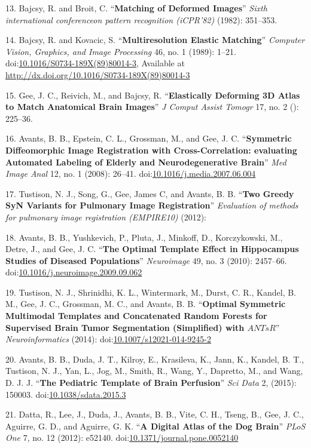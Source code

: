 \documentclass[11pt,]{article}
\begin{document}
13. Bajcsy, R. and Broit, C. ``\textbf{Matching of Deformed Images}''
\emph{Sixth international conferenceon pattern recognition (iCPR'82)}
(1982): 351--353.

14. Bajcsy, R. and Kovacic, S. ``\textbf{Multiresolution Elastic
Matching}'' \emph{Computer Vision, Graphics, and Image Processing} 46,
no. 1 (1989): 1--21.
doi:\href{http://dx.doi.org/10.1016/S0734-189X(89)80014-3}{10.1016/S0734-189X(89)80014-3},
Available at \url{http://dx.doi.org/10.1016/S0734-189X(89)80014-3}

15. Gee, J. C., Reivich, M., and Bajcsy, R. ``\textbf{Elastically
Deforming 3D Atlas to Match Anatomical Brain Images}'' \emph{J Comput
Assist Tomogr} 17, no. 2 (): 225--36.

16. Avants, B. B., Epstein, C. L., Grossman, M., and Gee, J. C.
``\textbf{Symmetric Diffeomorphic Image Registration with
Cross-Correlation: evaluating Automated Labeling of Elderly and
Neurodegenerative Brain}'' \emph{Med Image Anal} 12, no. 1 (2008):
26--41.
doi:\href{http://dx.doi.org/10.1016/j.media.2007.06.004}{10.1016/j.media.2007.06.004}

17. Tustison, N. J., Song, G., Gee, James C, and Avants, B. B.
``\textbf{Two Greedy SyN Variants for Pulmonary Image Registration}''
\emph{Evaluation of methods for pulmonary image registration (EMPIRE10)}
(2012):

18. Avants, B. B., Yushkevich, P., Pluta, J., Minkoff, D., Korczykowski,
M., Detre, J., and Gee, J. C. ``\textbf{The Optimal Template Effect in
Hippocampus Studies of Diseased Populations}'' \emph{Neuroimage} 49, no.
3 (2010): 2457--66.
doi:\href{http://dx.doi.org/10.1016/j.neuroimage.2009.09.062}{10.1016/j.neuroimage.2009.09.062}

19. Tustison, N. J., Shrinidhi, K. L., Wintermark, M., Durst, C. R.,
Kandel, B. M., Gee, J. C., Grossman, M. C., and Avants, B. B.
``\textbf{Optimal Symmetric Multimodal Templates and Concatenated Random
Forests for Supervised Brain Tumor Segmentation (Simplified) with
$ANTsR$}'' \emph{Neuroinformatics} (2014):
doi:\href{http://dx.doi.org/10.1007/s12021-014-9245-2}{10.1007/s12021-014-9245-2}

20. Avants, B. B., Duda, J. T., Kilroy, E., Krasileva, K., Jann, K.,
Kandel, B. T., Tustison, N. J., Yan, L., Jog, M., Smith, R., Wang, Y.,
Dapretto, M., and Wang, D. J. J. ``\textbf{The Pediatric Template of
Brain Perfusion}'' \emph{Sci Data} 2, (2015): 150003.
doi:\href{http://dx.doi.org/10.1038/sdata.2015.3}{10.1038/sdata.2015.3}

21. Datta, R., Lee, J., Duda, J., Avants, B. B., Vite, C. H., Tseng, B.,
Gee, J. C., Aguirre, G. D., and Aguirre, G. K. ``\textbf{A Digital Atlas
of the Dog Brain}'' \emph{PLoS One} 7, no. 12 (2012): e52140.
doi:\href{http://dx.doi.org/10.1371/journal.pone.0052140}{10.1371/journal.pone.0052140}
\end{document}
